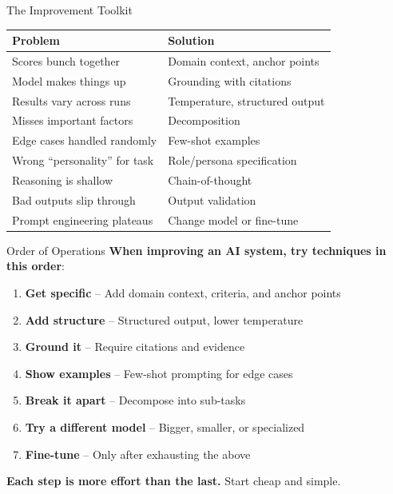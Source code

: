 \documentclass[aspectratio=169]{beamer}
\begin{document}
\begin{frame}{The Improvement Toolkit}
\begin{center}
\renewcommand{\arraystretch}{1.4}
\begin{tabular}{l l}
\textbf{Problem} & \textbf{Solution} \\
\hline
Scores bunch together & Domain context, anchor points \\
Model makes things up & Grounding with citations \\
Results vary across runs & Temperature, structured output \\
Misses important factors & Decomposition \\
Edge cases handled randomly & Few-shot examples \\
Wrong ``personality'' for task & Role/persona specification \\
Reasoning is shallow & Chain-of-thought \\
Bad outputs slip through & Output validation \\
Prompt engineering plateaus & Change model or fine-tune \\
\end{tabular}
\end{center}
\end{frame}

\begin{frame}{Order of Operations}
\textbf{When improving an AI system, try techniques in this order}:
\vspace{0.3cm}

\begin{enumerate}
    \item \textbf{Get specific} -- Add domain context, criteria, and anchor points
    \item \textbf{Add structure} -- Structured output, lower temperature
    \item \textbf{Ground it} -- Require citations and evidence
    \item \textbf{Show examples} -- Few-shot prompting for edge cases
    \item \textbf{Break it apart} -- Decompose into sub-tasks
    \item \textbf{Try a different model} -- Bigger, smaller, or specialized
    \item \textbf{Fine-tune} -- Only after exhausting the above
\end{enumerate}
\vspace{0.3cm}

\textbf{Each step is more effort than the last.} Start cheap and simple.
\end{frame}
\end{document}
